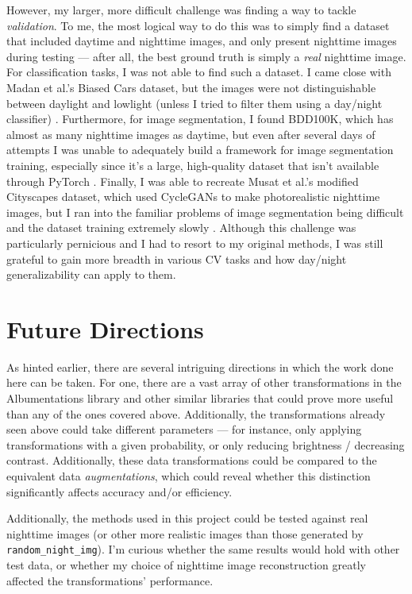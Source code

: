 \documentclass{article}
\begin{document}
However, my larger, more difficult challenge was finding a way to tackle \textit{validation}. To me, the most logical way to do this was to simply find a dataset that included daytime and nighttime images, and only present nighttime images during testing --- after all, the best ground truth is simply a \textit{real} nighttime image. For classification tasks, I was not able to find such a dataset. I came close with Madan et al.'s Biased Cars dataset, but the images were not distinguishable between daylight and lowlight (unless I tried to filter them using a day/night classifier) \cite{madan2022}. Furthermore, for image segmentation, I found BDD100K, which has almost as many nighttime images as daytime, but even after several days of attempts I was unable to adequately build a framework for image segmentation training, especially since it's a large, high-quality dataset that isn't available through PyTorch \cite{yu2020bdd100k}. Finally, I was able to recreate Musat et al.'s modified Cityscapes dataset, which used CycleGANs to make photorealistic nighttime images, but I ran into the familiar problems of image segmentation being difficult and the dataset training extremely slowly \cite{multiweather2021}. Although this challenge was particularly pernicious and I had to resort to my original methods, I was still grateful to gain more breadth in various CV tasks and how day/night generalizability can apply to them.

\section{Future Directions}
As hinted earlier, there are several intriguing directions in which the work done here can be taken. For one, there are a vast array of other transformations in the Albumentations library and other similar libraries that could prove more useful than any of the ones covered above. Additionally, the transformations already seen above could take different parameters --- for instance, only applying transformations with a given probability, or only reducing brightness / decreasing contrast.  Additionally, these data transformations could be compared to the equivalent data \textit{augmentations}, which could reveal whether this distinction significantly affects accuracy and/or efficiency.

Additionally, the methods used in this project could be tested against real nighttime images (or other more realistic images than those generated by \texttt{random\_night\_img}). I'm curious whether the same results would hold with other test data, or whether my choice of nighttime image reconstruction greatly affected the transformations' performance. 
\end{document}
